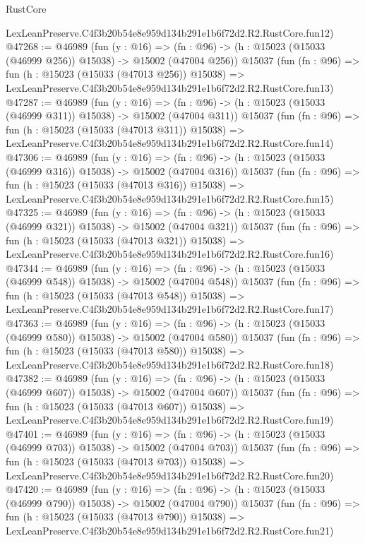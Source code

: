 \begin{lexlean}{RustCore}
\begin{coremodule}
    LexLeanPreserve.C4f3b20b54e8e959d134b291e1b6f72d2.R2.RustCore.fun12)
@47268 := @46989
    (fun (y : @16) =>
    (fn : @96) -> (h : @15023 (@15033 (@46999 @256)) @15038) -> @15002 (@47004 @256))
    @15037
    (fun (fn : @96) =>
    fun (h : @15023 (@15033 (@47013 @256)) @15038) =>
    LexLeanPreserve.C4f3b20b54e8e959d134b291e1b6f72d2.R2.RustCore.fun13)
@47287 := @46989
    (fun (y : @16) =>
    (fn : @96) -> (h : @15023 (@15033 (@46999 @311)) @15038) -> @15002 (@47004 @311))
    @15037
    (fun (fn : @96) =>
    fun (h : @15023 (@15033 (@47013 @311)) @15038) =>
    LexLeanPreserve.C4f3b20b54e8e959d134b291e1b6f72d2.R2.RustCore.fun14)
@47306 := @46989
    (fun (y : @16) =>
    (fn : @96) -> (h : @15023 (@15033 (@46999 @316)) @15038) -> @15002 (@47004 @316))
    @15037
    (fun (fn : @96) =>
    fun (h : @15023 (@15033 (@47013 @316)) @15038) =>
    LexLeanPreserve.C4f3b20b54e8e959d134b291e1b6f72d2.R2.RustCore.fun15)
@47325 := @46989
    (fun (y : @16) =>
    (fn : @96) -> (h : @15023 (@15033 (@46999 @321)) @15038) -> @15002 (@47004 @321))
    @15037
    (fun (fn : @96) =>
    fun (h : @15023 (@15033 (@47013 @321)) @15038) =>
    LexLeanPreserve.C4f3b20b54e8e959d134b291e1b6f72d2.R2.RustCore.fun16)
@47344 := @46989
    (fun (y : @16) =>
    (fn : @96) -> (h : @15023 (@15033 (@46999 @548)) @15038) -> @15002 (@47004 @548))
    @15037
    (fun (fn : @96) =>
    fun (h : @15023 (@15033 (@47013 @548)) @15038) =>
    LexLeanPreserve.C4f3b20b54e8e959d134b291e1b6f72d2.R2.RustCore.fun17)
@47363 := @46989
    (fun (y : @16) =>
    (fn : @96) -> (h : @15023 (@15033 (@46999 @580)) @15038) -> @15002 (@47004 @580))
    @15037
    (fun (fn : @96) =>
    fun (h : @15023 (@15033 (@47013 @580)) @15038) =>
    LexLeanPreserve.C4f3b20b54e8e959d134b291e1b6f72d2.R2.RustCore.fun18)
@47382 := @46989
    (fun (y : @16) =>
    (fn : @96) -> (h : @15023 (@15033 (@46999 @607)) @15038) -> @15002 (@47004 @607))
    @15037
    (fun (fn : @96) =>
    fun (h : @15023 (@15033 (@47013 @607)) @15038) =>
    LexLeanPreserve.C4f3b20b54e8e959d134b291e1b6f72d2.R2.RustCore.fun19)
@47401 := @46989
    (fun (y : @16) =>
    (fn : @96) -> (h : @15023 (@15033 (@46999 @703)) @15038) -> @15002 (@47004 @703))
    @15037
    (fun (fn : @96) =>
    fun (h : @15023 (@15033 (@47013 @703)) @15038) =>
    LexLeanPreserve.C4f3b20b54e8e959d134b291e1b6f72d2.R2.RustCore.fun20)
@47420 := @46989
    (fun (y : @16) =>
    (fn : @96) -> (h : @15023 (@15033 (@46999 @790)) @15038) -> @15002 (@47004 @790))
    @15037
    (fun (fn : @96) =>
    fun (h : @15023 (@15033 (@47013 @790)) @15038) =>
    LexLeanPreserve.C4f3b20b54e8e959d134b291e1b6f72d2.R2.RustCore.fun21)

\end{coremodule}
\end{lexlean}
